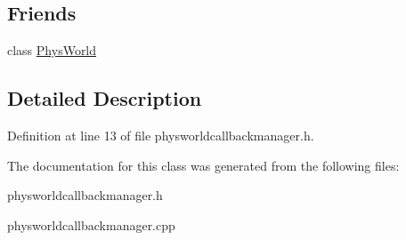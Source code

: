 \subsection*{Friends}
\begin{DoxyCompactItemize}
\item 
\hypertarget{classPhysWorldCallBackManager_a375fd37c70c941f0442997a60fdb05c7}{
class \hyperlink{classPhysWorldCallBackManager_a375fd37c70c941f0442997a60fdb05c7}{PhysWorld}}
\label{d4/d84/classPhysWorldCallBackManager_a375fd37c70c941f0442997a60fdb05c7}

\end{DoxyCompactItemize}


\subsection{Detailed Description}


Definition at line 13 of file physworldcallbackmanager.h.

The documentation for this class was generated from the following files:\begin{DoxyCompactItemize}
\item 
physworldcallbackmanager.h\item 
physworldcallbackmanager.cpp\end{DoxyCompactItemize}
